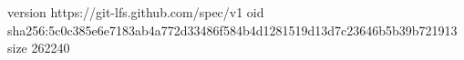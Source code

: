 version https://git-lfs.github.com/spec/v1
oid sha256:5c0c385e6e7183ab4a772d33486f584b4d1281519d13d7c23646b5b39b721913
size 262240
